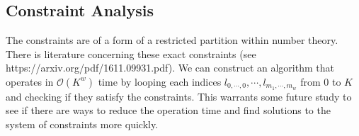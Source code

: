 \subsection{Constraint Analysis}

The constraints are of a form of a restricted partition within number theory. There is literature concerning these exact constraints (see https://arxiv.org/pdf/1611.09931.pdf). We can construct an algorithm that operates in $\mathcal{O}(K^w)$ time by looping each indices $l_{0, \cdots, 0}, \cdots, l_{m_1, \cdots, m_w}$ from $0$ to $K$ and checking if they satisfy the constraints. This warrants some future study to see if there are ways to reduce the operation time and find solutions to the system of constraints more quickly.